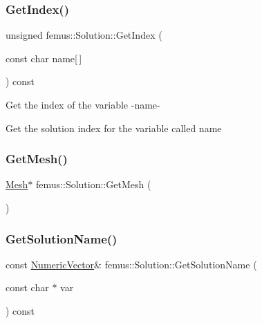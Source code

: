 \mbox{\label{classfemus_1_1_solution_ab7027e7a2d3e29aafbc770d4a908a3ec}} 
\subsubsection{\texorpdfstring{Get\+Index()}{GetIndex()}}
{\footnotesize\ttfamily unsigned femus\+::\+Solution\+::\+Get\+Index (\begin{DoxyParamCaption}\item[{const char}]{name\mbox{[}$\,$\mbox{]} }\end{DoxyParamCaption}) const}

Get the index of the variable -\/name-\/

Get the solution index for the variable called name \mbox{\label{classfemus_1_1_solution_aa2f09b8eebcbc5f00d4aa7e202474821}} 
\subsubsection{\texorpdfstring{Get\+Mesh()}{GetMesh()}}
{\footnotesize\ttfamily \mbox{\hyperlink{classfemus_1_1_mesh}{Mesh}}$\ast$ femus\+::\+Solution\+::\+Get\+Mesh (\begin{DoxyParamCaption}{ }\end{DoxyParamCaption})\hspace{0.3cm}{\ttfamily [inline]}}

\mbox{\label{classfemus_1_1_solution_a38d0ba7d713f9fc726a7605e3eb50f9f}} 
\subsubsection{\texorpdfstring{Get\+Solution\+Name()}{GetSolutionName()}\hspace{0.1cm}{\footnotesize\ttfamily [1/2]}}
{\footnotesize\ttfamily const \mbox{\hyperlink{classfemus_1_1_numeric_vector}{Numeric\+Vector}}\& femus\+::\+Solution\+::\+Get\+Solution\+Name (\begin{DoxyParamCaption}\item[{const char $\ast$}]{var }\end{DoxyParamCaption}) const\hspace{0.3cm}{\ttfamily [inline]}}

